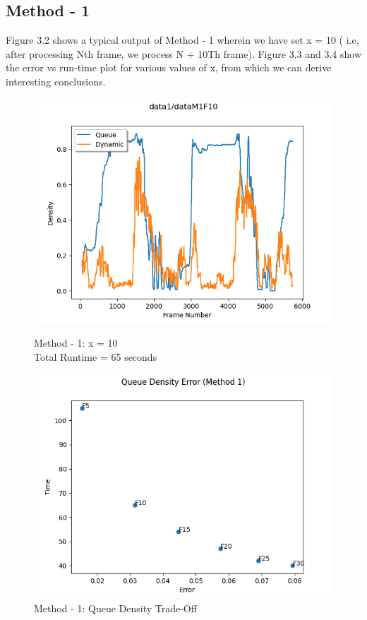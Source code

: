 \documentclass[paper=a4, fontsize = 12pt]{scrartcl}
\numberwithin{equation}{section}		%
\numberwithin{figure}{section}			%
\numberwithin{table}{section}				%
\begin{document}
\subsection{Method - 1}
Figure 3.2 shows a typical output of Method - 1 wherein we have set x = 10 ( i.e, after processing Nth frame, we process N + 10Th frame). Figure 3.3 and 3.4 show the error vs run-time plot for various values of x, from which we can derive interesting conclusions. 

\begin{figure}[H]
    \centering
    \captionsetup{justification=centering,margin=2cm}
    \includegraphics[width=15cm]{dataM1F10.png}
    \caption{ Method - 1: x = 10 \\Total Runtime = 65 seconds}
    \label{fig:typicalM1}
    
     \includegraphics[width=15cm]{method1_tradeoff_queue.png}
    \caption{ Method - 1: Queue Density Trade-Off}
    \label{fig:M1QueueTradeOff}

\end{figure}
\end{document}

